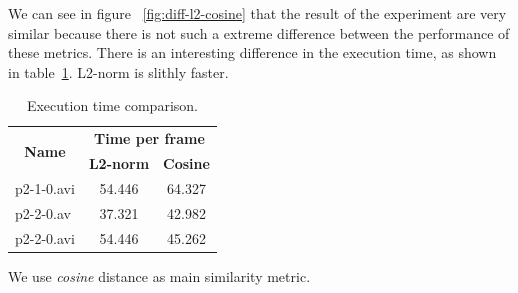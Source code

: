 We can see in figure ~\ref{fig:diff-l2-cosine} that the result of the experiment are very similar because there is not such a extreme difference between the performance of these metrics. There is an interesting difference in the execution time, as shown in table~\ref{table:dis-time}. L2-norm is slithly faster. 

\begin{table}[H]
\centering
\label{my-label}
\begin{tabular}{|l|c|c|}
\hline
\multicolumn{1}{|c|}{\multirow{2}{*}{\textbf{Name}}} & \multicolumn{2}{c|}{\textbf{Time per frame}} \\ \cline{2-3} 
\multicolumn{1}{|c|}{} & \textbf{L2-norm} & \textbf{Cosine} \\ \hline
p2-1-0.avi & 54.446 & 64.327 \\ \hline
p2-2-0.av & 37.321 & 42.982 \\ \hline
p2-2-0.avi & 54.446 & 45.262 \\ \hline
\end{tabular}
\label{table:dis-time}
\caption{Execution time comparison.}
\end{table}

We use \textit{cosine} distance as main similarity metric.
